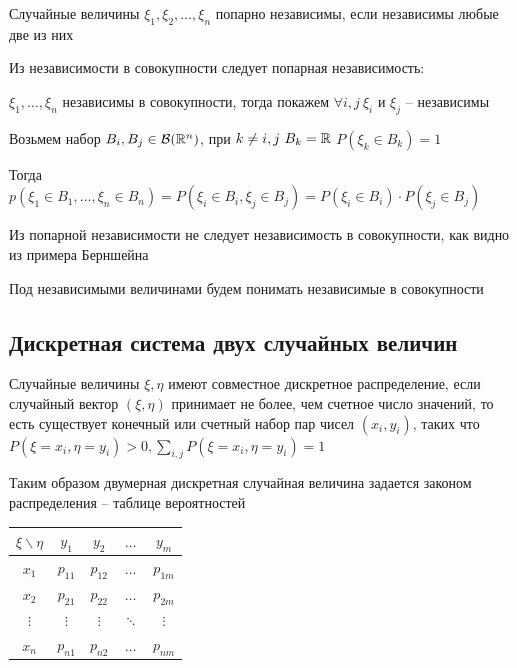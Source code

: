 \documentclass[12pt]{article}
\begin{document}
    \Def Случайные величины $\xi_1, \xi_2, \dots, \xi_n$ попарно независимы, если независимы любые две из них

    \Notas Из независимости в совокупности следует попарная независимость: 

    $\xi_1, \dots, \xi_n$ независимы в совокупности, тогда покажем $\forall i, j \ \xi_i$ и $\xi_j$ -- независимы

    Возьмем набор $B_i, B_j \in \mathcal{B}(\mathbb{R}^n)$, при $k \neq i, j \ B_k = \mathbb{R}$ \hfill $P(\xi_k \in B_k) = 1$

    Тогда $p(\xi_1 \in B_1, \dots, \xi_n \in B_n) = P(\xi_i \in B_i, \xi_j \in B_j) = P(\xi_i \in B_i) \cdot P(\xi_j \in B_j)$

    \Nota Из попарной независимости не следует независимость в совокупности, как видно из примера Берншейна

    Под независимыми величинами будем понимать независимые в совокупности

    \hypertarget{discretesystemoftwovariables}{}

    \subsection{Дискретная система двух случайных величин}

    \Def Случайные величины $\xi, \eta$ имеют совместное дискретное распределение, если случайный вектор $(\xi, \eta)$
    принимает не более, чем счетное число значений, то есть существует конечный или счетный набор пар чисел $(x_i, y_i)$, 
    таких что $P(\xi = x_i, \eta = y_i) > 0, \sum_{i, j} P(\xi = x_i, \eta = y_i) = 1$

    Таким образом двумерная дискретная случайная величина задается законом распределения -- таблице вероятностей

    \begin{tabular}{c|c|c|c|c}
        $\xi \backslash \eta$ & $y_1$ & $y_2$ & $\dots$ & $y_m$ \\
        \hline
        $x_1$ & $p_{11}$ & $p_{12}$ & $\dots$ & $p_{1m}$ \\
        \hline
        $x_2$ & $p_{21}$ & $p_{22}$ & $\dots$ & $p_{2m}$ \\
        \hline
        $\vdots$ & $\vdots$ & $\vdots$ & $\ddots$ & $\vdots$ \\
        \hline
        $x_n$ & $p_{n1}$ & $p_{n2}$ & $\dots$ & $p_{nm}$ \\
    \end{tabular}
\end{document}

